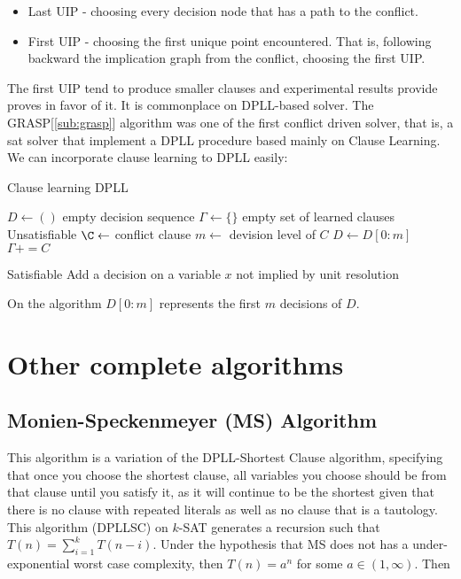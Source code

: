 \begin{itemize}
\item Last UIP - choosing every decision node that has a path to the conflict.
\item First UIP - choosing the first unique point encountered. That is, following backward the implication graph from the conflict, choosing the first UIP.
\end{itemize}


The first UIP tend to produce smaller clauses and experimental results \cite{tichy2006clause} \cite{zhang2001efficient} provide proves in favor of it. It is commonplace on DPLL-based solver. The GRASP[\ref{sub:grasp}] algorithm was one of the first conflict driven solver, that is, a sat solver that implement a DPLL procedure based mainly on Clause Learning. \\

We can incorporate clause learning to DPLL easily:
\begin{algorithm}    
  \caption{Clause learning DPLL \cite{darwiche2009complete}}\label{cldpll}
  \begin{algorithmic}[1]
    \State $D \gets ()$ empty decision sequence
\State $\Gamma \gets \{\}$ empty set of learned clauses
 \Return Unsatisfiable
\Else
\State $\C \gets $ conflict clause
\State $m \gets $ devision level of $C$
\State $D \gets D[0:m]$ 
\State $\Gamma += C$
\EndIf

\Else
{} 
\State\Return Satisfiable
\Else
\State Add a decision on a variable $x$ not implied by unit resolution 
\EndIf

\end{algorithmic}
\end{algorithm}

On the algorithm $D[0:m]$ represents the first $m$ decisions of $D$.


\section{Other complete algorithms}

\subsection{Monien-Speckenmeyer (MS) Algorithm}
\label{alg:MS}
This algorithm is a variation of the DPLL-Shortest Clause algorithm, specifying that once you choose the shortest clause, all variables you choose should be from that clause until you satisfy it, as it will continue to be the shortest given that there is no clause with repeated literals as well as no clause that is a tautology. This algorithm (DPLLSC) on $k$-SAT generates a recursion such that $T(n) = \sum_{i=1}^kT(n-i)$. Under the hypothesis that MS does not has a under-exponential worst case complexity, then $T(n) = a^n$ for some $a \in (1,\infty)$.  Then

